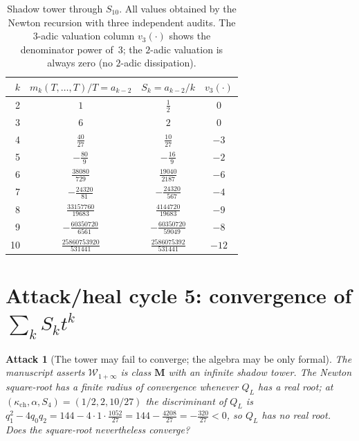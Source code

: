 \documentclass[11pt]{article}
\newtheorem{attack}{Attack}
\newcommand{\kch}{\kappa_{\mathrm{ch}}}
\newcommand{\Winf}{\mathcal{W}_{1+\infty}}
\begin{document}
\begin{table}[h]\centering
\begin{tabular}{rccc}
\toprule
$k$ & $m_k(T,\ldots,T)/T = a_{k-2}$ & $S_k = a_{k-2}/k$ & $v_3(\cdot)$\\
\midrule
2 & $1$                            & $\tfrac12$                & $0$\\
3 & $6$                            & $2$                       & $0$\\
4 & $\tfrac{40}{27}$               & $\tfrac{10}{27}$          & $-3$\\
5 & $-\tfrac{80}{9}$               & $-\tfrac{16}{9}$          & $-2$\\
6 & $\tfrac{38080}{729}$           & $\tfrac{19040}{2187}$     & $-6$\\
7 & $-\tfrac{24320}{81}$           & $-\tfrac{24320}{567}$     & $-4$\\
8 & $\tfrac{33157760}{19683}$      & $\tfrac{4144720}{19683}$  & $-9$\\
9 & $-\tfrac{60350720}{6561}$      & $-\tfrac{60350720}{59049}$& $-8$\\
10 & $\tfrac{25860753920}{531441}$  & $\tfrac{2586075392}{531441}$ & $-12$\\
\bottomrule
\end{tabular}
\caption{Shadow tower through $S_{10}$. All values obtained by the
Newton recursion with three independent audits. The $3$-adic valuation
column $v_3(\cdot)$ shows the denominator power of~$3$; the $2$-adic
valuation is always zero (no $2$-adic dissipation).}
\end{table}

\section{Attack/heal cycle 5: convergence of $\sum_k S_k t^k$}

\begin{attack}[The tower may fail to converge; the algebra may be only formal]
The manuscript asserts $\Winf$ is class $\mathbf{M}$ with an
infinite shadow tower. The Newton square-root has a finite radius
of convergence whenever $Q_L$ has a real root; at $(\kch,\alpha,S_4)
=(1/2,2,10/27)$ the discriminant of $Q_L$ is
$q_1^2-4q_0q_2 = 144 - 4\cdot 1\cdot \tfrac{1052}{27}
= 144 - \tfrac{4208}{27} = -\tfrac{320}{27} < 0$,
so $Q_L$ has no real root. Does the square-root nevertheless converge?
\end{attack}
\end{document}
